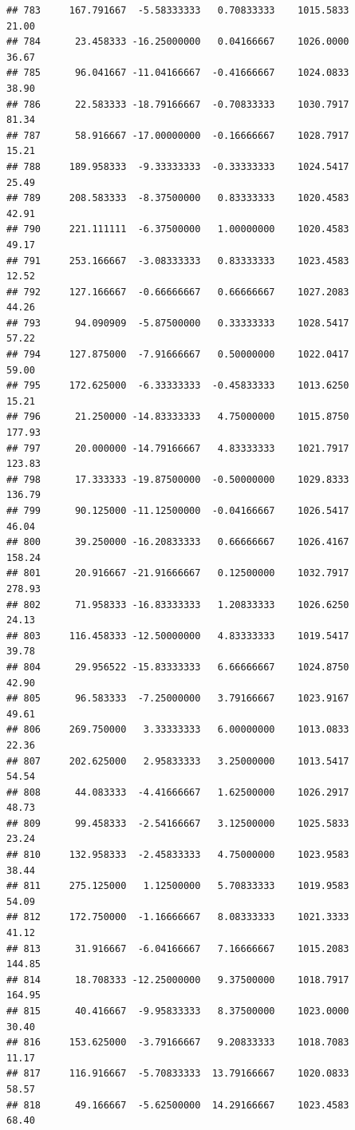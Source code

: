 \documentclass[
]{article}
\begin{document}
\begin{verbatim}
## 783     167.791667  -5.58333333   0.70833333    1015.5833       21.00
## 784      23.458333 -16.25000000   0.04166667    1026.0000       36.67
## 785      96.041667 -11.04166667  -0.41666667    1024.0833       38.90
## 786      22.583333 -18.79166667  -0.70833333    1030.7917       81.34
## 787      58.916667 -17.00000000  -0.16666667    1028.7917       15.21
## 788     189.958333  -9.33333333  -0.33333333    1024.5417       25.49
## 789     208.583333  -8.37500000   0.83333333    1020.4583       42.91
## 790     221.111111  -6.37500000   1.00000000    1020.4583       49.17
## 791     253.166667  -3.08333333   0.83333333    1023.4583       12.52
## 792     127.166667  -0.66666667   0.66666667    1027.2083       44.26
## 793      94.090909  -5.87500000   0.33333333    1028.5417       57.22
## 794     127.875000  -7.91666667   0.50000000    1022.0417       59.00
## 795     172.625000  -6.33333333  -0.45833333    1013.6250       15.21
## 796      21.250000 -14.83333333   4.75000000    1015.8750      177.93
## 797      20.000000 -14.79166667   4.83333333    1021.7917      123.83
## 798      17.333333 -19.87500000  -0.50000000    1029.8333      136.79
## 799      90.125000 -11.12500000  -0.04166667    1026.5417       46.04
## 800      39.250000 -16.20833333   0.66666667    1026.4167      158.24
## 801      20.916667 -21.91666667   0.12500000    1032.7917      278.93
## 802      71.958333 -16.83333333   1.20833333    1026.6250       24.13
## 803     116.458333 -12.50000000   4.83333333    1019.5417       39.78
## 804      29.956522 -15.83333333   6.66666667    1024.8750       42.90
## 805      96.583333  -7.25000000   3.79166667    1023.9167       49.61
## 806     269.750000   3.33333333   6.00000000    1013.0833       22.36
## 807     202.625000   2.95833333   3.25000000    1013.5417       54.54
## 808      44.083333  -4.41666667   1.62500000    1026.2917       48.73
## 809      99.458333  -2.54166667   3.12500000    1025.5833       23.24
## 810     132.958333  -2.45833333   4.75000000    1023.9583       38.44
## 811     275.125000   1.12500000   5.70833333    1019.9583       54.09
## 812     172.750000  -1.16666667   8.08333333    1021.3333       41.12
## 813      31.916667  -6.04166667   7.16666667    1015.2083      144.85
## 814      18.708333 -12.25000000   9.37500000    1018.7917      164.95
## 815      40.416667  -9.95833333   8.37500000    1023.0000       30.40
## 816     153.625000  -3.79166667   9.20833333    1018.7083       11.17
## 817     116.916667  -5.70833333  13.79166667    1020.0833       58.57
## 818      49.166667  -5.62500000  14.29166667    1023.4583       68.40

\end{verbatim}
\end{document}

